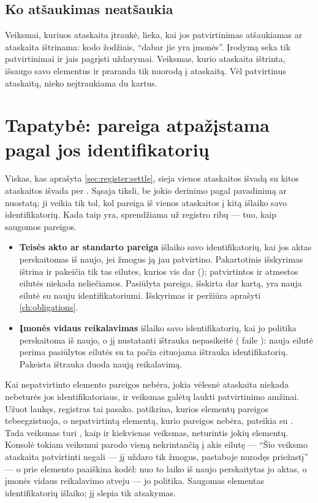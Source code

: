 \subsection{Ko atšaukimas neatšaukia}

Veiksmai, kuriuos ataskaita įtraukė, lieka, kai jos patvirtinimas atšaukiamas ar ataskaita
ištrinama: kodo žodžiais, \enquote{dabar jie yra įmonės}. Įrodymą seka tik patvirtinimai ir jais
pagrįsti uždarymai. Veiksmas, kurio ataskaita ištrinta, išsaugo savo elementus ir praranda tik
nuorodą į ataskaitą. Vėl patvirtinus ataskaitą, nieko neįtraukiama du kartus.


\section{Tapatybė: pareiga atpažįstama pagal jos identifikatorių}\label{sec:register:identity}

Viskas, kas aprašyta \cref{sec:register:settle}, sieja vienos ataskaitos išvadą su kitos
ataskaitos išvada per . Sąsaja tiksli, be jokio derinimo pagal pavadinimą ar
nuostatą; ji veikia tik tol, kol pareiga iš vienos ataskaitos į kitą išlaiko savo
identifikatorių. Kada taip yra, sprendžiama už registro ribų --- tuo, kaip saugomos pareigos.

\begin{itemize}
  \item \textbf{Teisės akto ar standarto pareiga} išlaiko savo identifikatorių, kai jos aktas
    perskaitomas iš naujo, jei žmogus ją jau patvirtino. Pakartotinis išskyrimas ištrina ir
    pakeičia tik tas eilutes, kurios vis dar  ();
    patvirtintos ir atmestos eilutės niekada neliečiamos. Pasiūlyta pareiga, išskirta dar kartą,
    yra nauja eilutė su nauju identifikatoriumi. Išskyrimas ir peržiūra aprašyti
    \cref{ch:obligations}.
  \item \textbf{Įmonės vidaus reikalavimas} išlaiko savo identifikatorių, kai jo politika
    perskaitoma iš naujo, o jį nustatanti ištrauka nepasikeitė ( faile
    ): nauja eilutė perima pasiūlytos eilutės su ta pačia cituojama
    ištrauka identifikatorių. Pakeista ištrauka duoda naują reikalavimą.
\end{itemize}

Kai nepatvirtinto elemento pareigos nebėra, jokia vėlesnė ataskaita niekada nebeturės jos
identifikatoriaus, ir veiksmas galėtų laukti patvirtinimo amžinai. Užuot laukęs, registras tai
pasako.  patikrina, kurios elementų pareigos tebeegzistuoja, o
 nepatvirtintą elementą, kurio pareigos nebėra, pateikia su
. Tada veiksmas turi , kaip ir kiekvienas
veiksmas, neturintis jokių elementų. Konsolė tokiam veiksmui parodo vieną nekrintančią į akis
eilutę --- \enquote{Šio veiksmo ataskaita patvirtinti negali --- jį uždaro tik žmogus, pastaboje
nurodęs priežastį} --- o prie elemento paaiškina kodėl: nuo to laiko iš naujo perskaitytas jo aktas, o įmonės
vidaus reikalavimo atveju --- jo politika. Saugomas elementas
identifikatorių išlaiko; jį slepia tik atsakymas.

